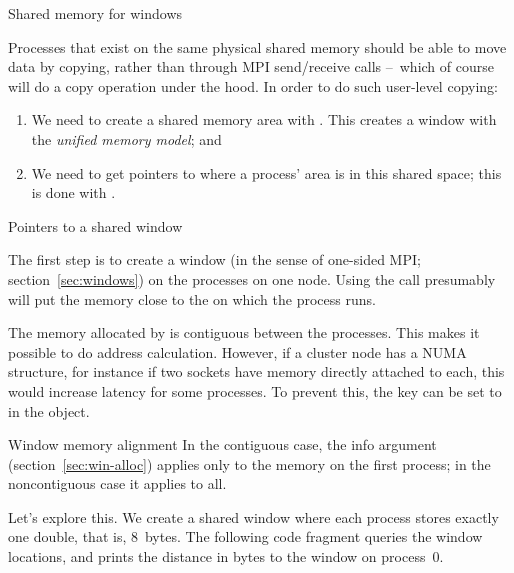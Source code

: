  {Shared memory for windows}

Processes that exist on the same physical shared memory should be able
to move data by copying, rather than through MPI send/receive calls
--~which of course will do a copy operation under the hood.
In order to do such user-level copying:
\begin{enumerate}
\item We need to create a shared memory area with
  .
  This creates a window with the
  \emph{unified memory model};
  and
\item We need to get pointers to where a process' area is in this
  shared space; this is done with .
\end{enumerate}

 {Pointers to a shared window}

The first step is to create a window (in the sense of one-sided MPI;
section~\ref{sec:windows}) on the processes on one node.
Using the  call presumably will
put the memory close to the 
 on which the process runs.


The memory allocated by  is
contiguous between the processes. This makes it possible to do address
calculation. However, if a cluster node has a \ac{NUMA} structure, for
instance if two sockets have memory directly attached to each, this
would increase latency for some processes. To prevent this, the key
 can be set to  in the
 object.
\begin{mpifournote}{Window memory alignment}
  In the contiguous case, the 
  info argument
  (section~\ref{sec:win-alloc})
  applies only to the memory on the first process;
  in the noncontiguous case it applies to all.
\end{mpifournote}


Let's explore this.
We create a shared window where each process stores exactly one double,
that is, 8~bytes.
The following code fragment queries the window locations,
and prints the distance in bytes to the window on process~0.
%

